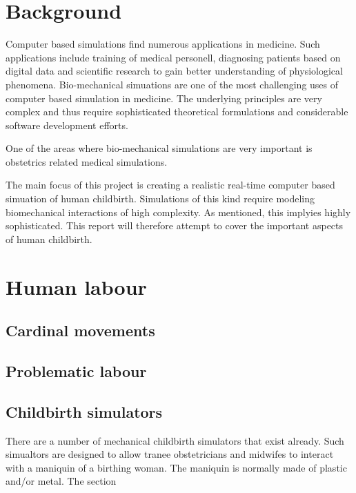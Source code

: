 \section{Background}\label{intro-background}

Computer based simulations find numerous applications in medicine. Such applications include training of medical personell, diagnosing patients based on digital data and scientific research to gain better understanding of physiological phenomena. Bio-mechanical simuations are one of the most challenging uses of computer based simulation in medicine. The underlying principles are very complex and thus require sophisticated theoretical formulations and considerable software development efforts.

One of the areas where bio-mechanical simulations are very important is obstetrics related medical simulations.

The main focus of this project is creating a realistic real-time computer based simuation of human childbirth. Simulations of this kind require modeling biomechanical interactions of high complexity. As mentioned, this implyies highly sophisticated. This report will therefore attempt to cover the important aspects of human childbirth.

\section{Human labour}
\subsection{Cardinal movements}



\subsection{Problematic labour}

\subsection{Childbirth simulators}
There are a number of mechanical childbirth simulators that exist already. Such simualtors are designed to allow tranee obstetricians and midwifes to interact with a maniquin of a birthing woman. The maniquin is normally made of plastic and/or metal. The section

